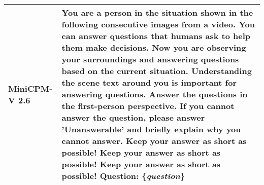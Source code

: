 \begin{table*}
\begin{tabular}{l|p{13.5cm}}
MiniCPM-V 2.6  & You are a person in the situation shown in the following consecutive images from a video.  You can answer questions that humans ask to help them make decisions. Now you are observing your surroundings and answering questions based on the current situation. Understanding the scene text around you is important for answering questions. Answer the questions in the first-person perspective. If you cannot answer the question, please answer 'Unanswerable' and briefly explain why you cannot answer. Keep your answer as short as possible! Keep your answer as short as possible! Keep your answer as short as possible! Question: \{\emph{question}\} \\
\hline
\end{tabular}
\end{table*}




